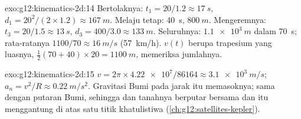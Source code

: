 \begin{solution}{exo:g12:kinematics-2d:14}
Bertolaknya: $t_1 = 20/1.2 \approx \qty{17}{s}$,
$d_1 = 20^2/(2 \times 1.2) \approx \qty{167}{m}$. Melaju tetap:
\qty{40}{s}, $\qty{800}{m}$. Mengeremnya: $t_3 = 20/1.5 \approx
\qty{13}{s}$, $d_3 = 400/3.0 \approx \qty{133}{m}$. Seluruhnya:
$\qty{1.1e3}{m}$ dalam \qty{70}{s}; rata-ratanya $1100/70 \approx
\qty{16}{m/s}$ (\qty{57}{km/h}). $v(t)$ berupa trapesium yang luasnya,
$\tfrac12(70 + 40) \times 20 = \qty{1100}{m}$, memeriksa jumlahnya.
\end{solution}

\begin{solution}{exo:g12:kinematics-2d:15}
$v = 2\pi \times \num{4.22e7}/\num{86164} \approx \qty{3.1e3}{m/s}$;
$a_n = v^2/R \approx \qty{0.22}{m/s^2}$. Gravitasi Bumi pada jarak itu
memasoknya;  sama dengan  putaran Bumi, sehingga
 dan tanahnya berputar bersama dan  itu menggantung di
atas satu titik khatulistiwa (\cref{ch:g12:satellites-kepler}).
\end{solution}

